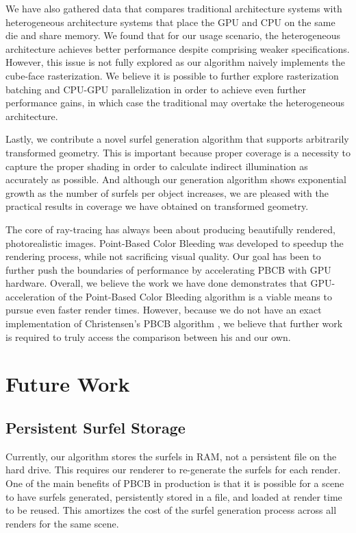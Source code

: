 We have also gathered data that compares traditional architecture systems with heterogeneous architecture systems that place the GPU and CPU on the same die and share memory. We found that for our usage scenario, the heterogeneous architecture achieves better performance despite comprising weaker specifications. However, this issue is not fully explored as our algorithm naively implements the cube-face rasterization. We believe it is possible to further explore rasterization batching and CPU-GPU parallelization in order to achieve even further performance gains, in which case the traditional may overtake the heterogeneous architecture.

Lastly, we contribute a novel surfel generation algorithm that supports arbitrarily transformed geometry. This is important because proper coverage is a necessity to capture the proper shading in order to calculate indirect illumination as accurately as possible. And although our generation algorithm shows exponential growth as the number of surfels per object increases, we are pleased with the practical results in coverage we have obtained on transformed geometry.

The core of ray-tracing has always been about producing beautifully rendered, photorealistic images. Point-Based Color Bleeding was developed to speedup the rendering process, while not sacrificing visual quality. Our goal has been to further push the boundaries of performance by accelerating PBCB with GPU hardware. Overall, we believe the work we have done demonstrates that GPU-acceleration of the Point-Based Color Bleeding algorithm is a viable means to pursue even faster render times. However, because we do not have an exact implementation of Christensen's PBCB algorithm \cite{bib:christensen2008}, we believe that further work is required to truly access the comparison between his and our own.

\section{Future Work}
\label{sec:future_work}

\subsection{Persistent Surfel Storage}
Currently, our algorithm stores the surfels in RAM, not a persistent file on the hard drive. This requires our renderer to re-generate the surfels for each render. One of the main benefits of PBCB in production is that it is possible for a scene to have surfels generated, persistently stored in a file, and loaded at render time to be reused. This amortizes the cost of the surfel generation process across all renders for the same scene.

